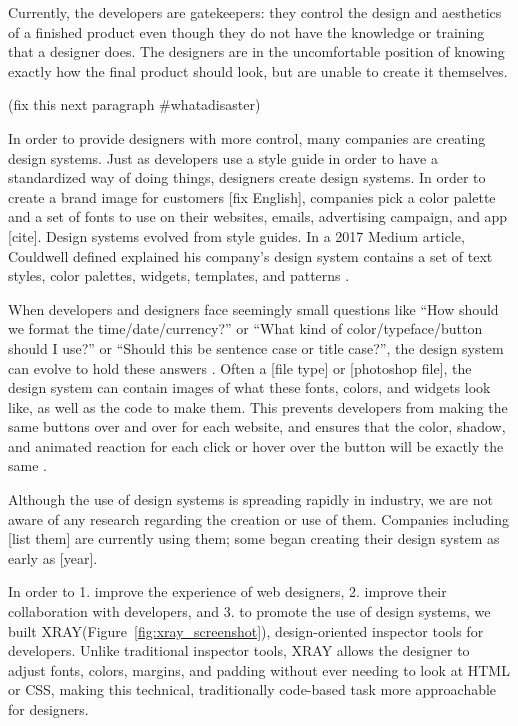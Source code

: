 \documentclass{sigchi}
\newcommand{\xray}{XRAY\xspace}
\begin{document}
Currently, the developers are gatekeepers: they control the design and aesthetics of a finished product even though they do not have the knowledge or training that a designer does. The designers are in the uncomfortable position of knowing exactly how the final product should look, but are unable to create it themselves. 

(fix this next paragraph \#whatadisaster)


In order to provide designers with more control, many companies are creating design systems. Just as developers use a style guide in order to have a standardized way of doing things, designers create design systems. In order to create a brand image for customers [fix English], companies pick a color palette and a set of fonts to use on their websites, emails, advertising campaign, and app [cite]. Design systems evolved from style guides. In a 2017 Medium article, Couldwell defined explained his company's design system contains a set of text styles, color palettes, widgets, templates, and patterns \cite{design_system_at_plasma_couldwell_medium_2017}. 


When developers and designers face seemingly small questions like ``How should we format the time/date/currency?'' or ``What kind of color/typeface/button should I use?'' or ``Should this be sentence case or title case?'', the design system can evolve to hold these answers \cite{what_is_design_system_couldwell_medium_2017}. Often a [file type] or [photoshop file], the design system can contain images of what these fonts, colors, and widgets look like, as well as the code to make them. This prevents developers from making the same buttons over and over for each website, and ensures that the color, shadow, and animated reaction for each click or hover over the button will be exactly the same \cite{what_is_design_system_couldwell_medium_2017}. 

Although the use of design systems is spreading rapidly in industry, we are not aware of any research regarding the creation or use of them. Companies including [list them] are currently using them; some began creating their design system as early as [year]. 

In order to 1. improve the experience of web designers, 2. improve their collaboration with developers, and 3. to promote the use of design systems, we built \xray (Figure~\ref{fig:xray_screenshot}), design-oriented inspector tools for developers. Unlike traditional inspector tools, \xray allows the designer to adjust fonts, colors, margins, and padding without ever needing to look at HTML or CSS, making this technical, traditionally code-based task more approachable for designers. 
\end{document}

